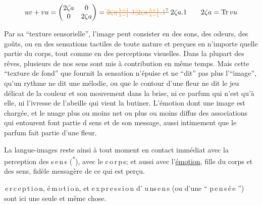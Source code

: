 \[
uv+vu=\begin{pmatrix}2\zeta a&0\\0&2\zeta a\end{pmatrix}
=\deleted{\unsure{2\zeta\eta\frac{\lambda+1}{\lambda-1}.1|2\zeta a\frac{\lambda+1}{\lambda-1}.1}}\;2\zeta a.1
\qquad 2\zeta a=\operatorname{Tr}vu
\]


Par sa ``texture sensorielle'', l'image peut consister en des sons,  des odeurs,  des goûts, ou en des sensations tactiles de toute nature et perçues en n'importe quelle partie du corps, tout comme en des perceptions visuelles. Dans la plupart des rêves, plusieurs de nos sens sont mis à contribution en même temps. Mais cette ``texture de fond'' que fournit la sensation n'épuise et ne ``dit'' pas plus l'``image'', qu'un rythme ne dit une mélodie, ou que le contour d'une fleur ne dit le jeu délicat de la couleur et son mouvement dans la brise, ni ce parfum qui n'est qu'à elle, ni l'ivresse de l'abeille qui vient la butiner. L'émotion dont une image est chargée, et  le nuage plus ou moins net ou plus ou moins diffus des associations qui entourent\handwritten{,} font partie d  sens  et de son message, aussi intimement que le parfum fait partie d'une fleur.

La langue-images reste ainsi\handwritten{,} à tout moment\handwritten{,} en contact immédiat avec la perception des \mbox{s\,e\,n\,s} (\textsuperscript{*}), avec le \mbox{c\,o\,r\,p\,s}\handwritten{\inserted{(**)}}; et aussi avec l'\uline{émotion}, fille du corps et des sens, fidèle messagère de ce qui est perçu.

 \mbox{\,e\,r\,c\,e\,p\,t\,i\,o\,n}, \mbox{é\,m\,o\,t\,i\,o\,n}, et \mbox{e\,x\,p\,r\,e\,s\,s\,i\,o\,n} d' \mbox{u\,n\quad s\,e\,n\,s} (ou d'une `` \mbox{p\,e\,n\,s\,é\,e} '') sont  ici une seule et même chose.


